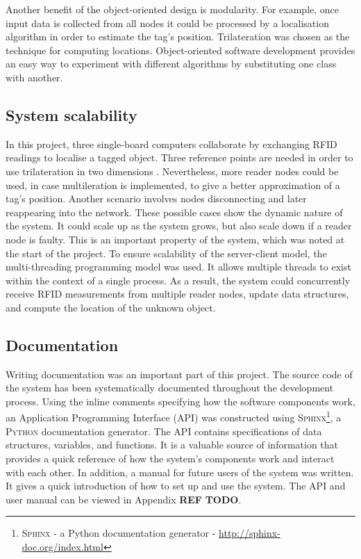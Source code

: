 Another benefit of the object-oriented design is modularity. For example, once input data is collected from all nodes it could be processed by a localisation algorithm in order to estimate the tag's position. Trilateration was chosen as the technique for computing locations. Object-oriented software development provides an easy way to experiment with different algorithms by substituting one class with another.

\subsection{System scalability}

In this project, three single-board computers collaborate by exchanging RFID readings to localise a tagged object. Three reference points are needed in order to use trilateration in two dimensions  \cite{Zhang2009}. Nevertheless, more reader nodes could be used, in case multileration is implemented, to give a better approximation of a tag's position. Another scenario involves nodes disconnecting and later reappearing into the network. These possible cases show the dynamic nature of the system. It could scale up as the system grows, but also scale down if a reader node is faulty. This is an important property of the system, which was noted at the start of the project. To ensure scalability of the server-client model, the multi-threading programming model was used. It allows multiple threads to exist within the context of a single process. As a result, the system could concurrently receive RFID measurements from multiple reader nodes, update data structures, and compute the location of the unknown object.

\subsection{Documentation}

Writing documentation was an important part of this project. The source code of the system has been systematically documented throughout the development process. Using the inline comments specifying how the software components work, an Application Programming Interface (API) was constructed using \textsc{Sphinx}\footnote{\textsc{Sphinx} - a Python documentation generator - \url{http://sphinx-doc.org/index.html}}, a \textsc{Python} documentation generator. The API contains specifications of data structures, variables, and functions. It is a valuable source of information that provides a quick reference of how the system's components work and interact with each other. In addition, a manual for future users of the system was written. It gives a quick introduction of how to set up and use the system. The API and user manual can be viewed in Appendix \textbf{REF}  \textbf{TODO}.

